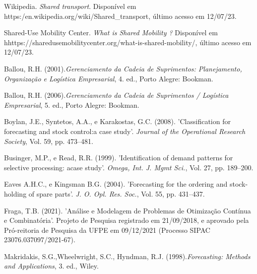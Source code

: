 \documentclass[11pt,a4paper]{article}
\begin{document}
%
%

\clearpage
\begin{thebibliography}{12}

Wikipedia. {\it Shared transport}. Disponível em https:/en.wikipedia.org/wiki/Shared\_transport, último acesso em 12/07/23.

Shared-Use Mobility Center. {\it What is Shared Mobility ?} Disponível em hhttps://sharedusemobilitycenter.org/what-is-shared-mobility/, último acesso em 12/07/23.

Ballou, R.H. (2001).{\it Gerenciamento da Cadeia de Suprimentos: Planejamento, Organização e Logística Empresarial}, 4. ed., Porto Alegre: Bookman.

Ballou, R.H. (2006).{\it Gerenciamento da Cadeia de Suprimentos / Logística Empresarial}, 5. ed., Porto Alegre: Bookman.

Boylan, J.E., Syntetos, A.A., e Karakostas, G.C. (2008). 'Classification for forecasting and stock control:a case study'. {\it Journal of the Operational Research Society}, Vol. 59, pp. 473--481.

Businger, M.P., e Read, R.R. (1999). 'Identification of demand patterns for selective processing: acase study'. {\it Omega, Int. J. Mgmt Sci.}, Vol. 27, pp. 189--200.

Eaves A.H.C., e Kingsman B.G. (2004). 'Forecasting for the ordering and stock-holding of spare parts'. {\it J. O. Opl. Res. Soc.}, Vol. 55, pp. 431--437.

Fraga, T.B. (2021). 'Análise e Modelagem de Problemas de Otimização Contínua e Combinatória'. Projeto de Pesquisa registrado em 21/09/2018, e aprovado pela Pró-reitoria de Pesquisa da UFPE em 09/12/2021 (Processo SIPAC 23076.037097/2021-67).

Makridakis, S.G.,Wheelwright, S.C., Hyndman, R.J. (1998).{\it Forecasting: Methods and Applications}, 3. ed., Wiley.


\end{thebibliography}
\end{document}
